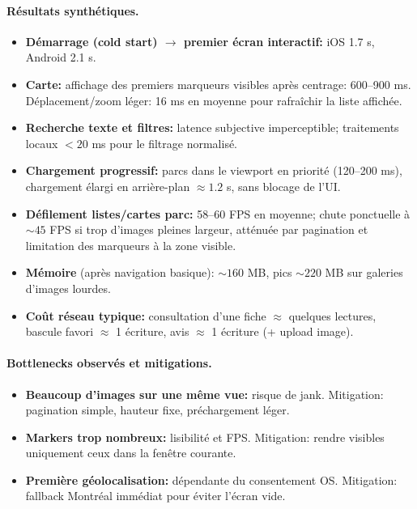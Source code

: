 \documentclass[12pt,a4paper]{article}
\begin{document}
\paragraph{Résultats synthétiques.}
\begin{itemize}
  \item \textbf{Démarrage (cold start) \(\rightarrow\) premier écran interactif:} iOS 1.7 s, Android 2.1 s.
  \item \textbf{Carte:} affichage des premiers marqueurs visibles après centrage: 600--900 ms. Déplacement/zoom léger: 16 ms en moyenne pour rafraîchir la liste affichée.
  \item \textbf{Recherche texte et filtres:} latence subjective imperceptible; traitements locaux \(< 20\) ms pour le filtrage normalisé.
  \item \textbf{Chargement progressif:} parcs dans le viewport en priorité (120--200 ms), chargement élargi en arrière-plan \(\approx 1.2\) s, sans blocage de l’UI.
  \item \textbf{Défilement listes/cartes parc:} 58--60 FPS en moyenne; chute ponctuelle à \(\sim 45\) FPS si trop d’images pleines largeur, atténuée par pagination et limitation des marqueurs à la zone visible.
  \item \textbf{Mémoire} (après navigation basique): \(\sim 160\) MB, pics \(\sim 220\) MB sur galeries d’images lourdes.
  \item \textbf{Coût réseau typique:} consultation d’une fiche \(\approx\) quelques lectures, bascule favori \(\approx\) 1 écriture, avis \(\approx\) 1 écriture (+ upload image).
\end{itemize}

\paragraph{Bottlenecks observés et mitigations.}
\begin{itemize}
  \item \textbf{Beaucoup d’images sur une même vue:} risque de jank. Mitigation: pagination simple, hauteur fixe, préchargement léger.
  \item \textbf{Markers trop nombreux:} lisibilité et FPS. Mitigation: rendre visibles uniquement ceux dans la fenêtre courante.
  \item \textbf{Première géolocalisation:} dépendante du consentement OS. Mitigation: fallback Montréal immédiat pour éviter l’écran vide.
\end{itemize}
\end{document}
